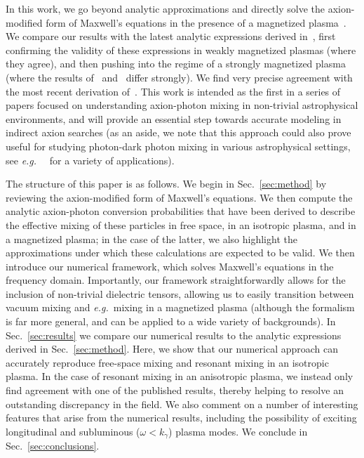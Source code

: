 \documentclass[twocolumn,superscriptaddress,floatfix,preprintnumbers,prd,nofootinbib,aps,10pt]{revtex4-2}
\renewcommand\({\left(}
\renewcommand\){\right)}
\renewcommand\[{\left[}
\renewcommand\]{\right]}
\newcommand\eg{{\it e.g.}~}
\begin{document}
In this work, we go beyond analytic approximations and directly solve the axion-modified form of Maxwell's equations in the presence of a magnetized plasma~\cite{Wilczek:1987mv}. We compare our results with the latest analytic expressions derived in~\cite{millar2021axionphotonUPDATED,mcdonald2023axionphoton}, first confirming the validity of these expressions in weakly magnetized plasmas (where they agree), and then pushing into the regime of a strongly magnetized plasma (where the results of~\cite{millar2021axionphotonUPDATED} and~\cite{mcdonald2023axionphoton} differ strongly). We find very precise agreement with the most recent derivation of~\cite{mcdonald2023axionphoton}. This work is intended as the first in a series of papers focused on understanding axion-photon mixing in non-trivial astrophysical environments, and will provide an essential step towards accurate modeling in indirect axion searches (as an aside, we note that this approach could also prove useful for studying photon-dark photon mixing in various astrophysical settings, see \eg~\cite{McDermott:2019lch,Witte:2020rvb,Caputo:2020bdy,Caputo:2021efm,Hardy:2022ufh,Cannizzaro:2022xyw,Siemonsen:2022ivj} for a variety of applications).

The structure of this paper is as follows. We begin in Sec.~\ref{sec:method} by reviewing the axion-modified form of Maxwell's equations. We then compute the analytic axion-photon conversion probabilities that have been derived to describe the effective mixing of these particles in free space, in an isotropic plasma, and in a magnetized plasma; in the case of the latter, we also highlight the approximations under which these calculations are expected to be valid. We then introduce our numerical framework, which solves Maxwell's equations in the frequency domain. Importantly, our framework straightforwardly allows for the inclusion of non-trivial dielectric tensors, allowing us to easily transition between vacuum mixing and \eg mixing in a magnetized plasma (although the formalism is far more general, and can be applied to a wide variety of backgrounds). In Sec.~\ref{sec:results} we compare our numerical results to the analytic expressions derived in Sec.~\ref{sec:method}. Here, we show that our numerical approach can accurately reproduce free-space mixing and resonant mixing in an isotropic plasma. In the case of resonant mixing in an anisotropic plasma, we instead only find agreement with one of the published results, thereby helping to resolve an outstanding discrepancy in the field. We also comment on a number of interesting features that arise from the numerical results, including the possibility of exciting longitudinal and subluminous ($\omega < k_\gamma$) plasma modes. We conclude in Sec.~\ref{sec:conclusions}.
\end{document}
